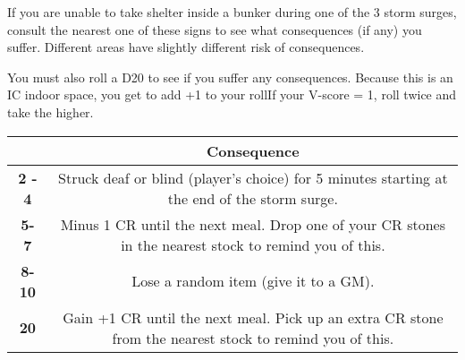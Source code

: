 \documentclass[green]{GL2020}
\begin{document}
\name{\gStormSurgeInside{}}

If you are unable to take shelter inside a bunker during one of the 3 storm surges, consult the nearest one of these signs to see what consequences (if any) you suffer. Different areas have slightly different risk of consequences.

You must also roll a D20 to see if you suffer any consequences. Because this is an IC indoor space, you get to add +1 to your rollIf your V-score = 1, roll twice and take the higher.

\begin{tabularx}{\textwidth}{|>{\centering\arraybackslash}c | >{\centering\arraybackslash}c |}
\hline
  {\large What you Roll +1} & {\large Consequence}  \\
\hline
  \textbf{2 - 4} & Struck deaf or blind (player’s choice) for 5 minutes starting at the end of the storm surge.  \\
\hline
  \textbf{5- 7} & Minus 1 CR until the next meal. Drop one of your CR stones in the nearest stock to remind you of this.  \\
\hline
  \textbf{8- 10} & Lose a random item (give it to a GM).  \\
\hline
 \textbf{20} & Gain +1 CR until the next meal. Pick up an extra CR stone from the nearest stock to remind you of this.  \\
\hline
\end{tabularx}
\end{document}
